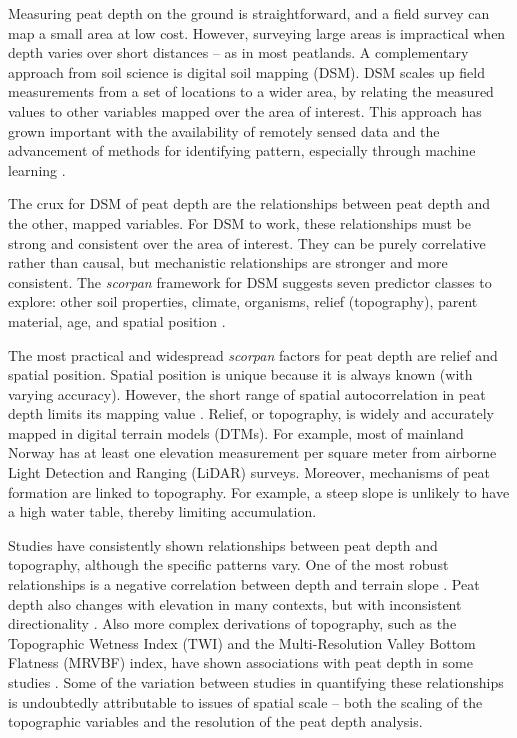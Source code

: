 \documentclass[soil, manuscript]{copernicus}
\begin{document}
Measuring peat depth on the ground is straightforward, and a field survey can map a small area at low cost.
However, surveying large areas is impractical when depth varies over short distances -- as in most peatlands.
A complementary approach from soil science is digital soil mapping (DSM).
DSM scales up field measurements from a set of locations to a wider area, by relating the measured values to other variables mapped over the area of interest.
This approach has grown important with the availability of remotely sensed data and the advancement of methods for identifying pattern, especially through machine learning \citep{minasnyDigitalMappingPeatlands2019, wadouxMachineLearningDigital2020}.

The crux for DSM of peat depth are the relationships between peat depth and the other, mapped variables.
For DSM to work, these relationships must be strong and consistent over the area of interest.
They can be purely correlative rather than causal, but mechanistic relationships are stronger and more consistent.
The \emph{scorpan} framework for DSM suggests seven predictor classes to explore: other soil properties, climate, organisms, relief (topography), parent material, age, and spatial position \citep{mcbratneyDigitalSoilMapping2003}.

The most practical and widespread \emph{scorpan} factors for peat depth are relief and spatial position.
Spatial position is unique because it is always known (with varying accuracy).
However, the short range of spatial autocorrelation in peat depth limits its mapping value \citep{henglGenericFrameworkSpatial2004}.
Relief, or topography, is widely and accurately mapped in digital terrain models (DTMs).
For example, most of mainland Norway has at least one elevation measurement per square meter from airborne Light Detection and Ranging (LiDAR) surveys.
Moreover, mechanisms of peat formation are linked to topography.
For example, a steep slope is unlikely to have a high water table, thereby limiting accumulation.

Studies have consistently shown relationships between peat depth and topography, although the specific patterns vary.
One of the most robust relationships is a negative correlation between depth and terrain slope \citep[e.g.][]{holdenEstimatingCarbonStock2011, parryMethodModellingPeat2012, gatisMappingUplandPeat2019}.
Peat depth also changes with elevation in many contexts, but with inconsistent directionality \citep[e.g.][]{holdenEstimatingCarbonStock2011, parryMethodModellingPeat2012, rudiyantoDigitalMappingCosteffective2016, rudiyantoOpenDigitalMapping2018, kogantiMappingPeatDepth2023, liFactorsControllingPeat2024}.
Also more complex derivations of topography, such as the Topographic Wetness Index (TWI) and the Multi-Resolution Valley Bottom Flatness (MRVBF) index, have shown associations with peat depth in some studies \citep[e.g.][]{rudiyantoOpenDigitalMapping2018, kogantiMappingPeatDepth2023, liFactorsControllingPeat2024}.
Some of the variation between studies in quantifying these relationships is undoubtedly attributable to issues of spatial scale -- both the scaling of the topographic variables and the resolution of the peat depth analysis.
\end{document}

